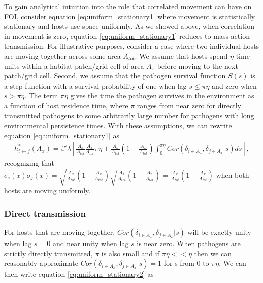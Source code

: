 \documentclass[letterpaper]{article}
\begin{document}
To gain analytical intuition into the role that correlated movement can have on FOI, consider equation \ref{eq:uniform_stationary1} where movement is statistically stationary and hosts use space uniformly.  As we showed above, when correlation in movement is zero, equation \ref{eq:uniform_stationary1} reduces to mass action transmission. 
For illustrative purposes, consider a case where two individual hosts are moving together across some area $A_{tot}$. We assume that hosts spend $\eta$ time units within a habitat patch/grid cell of area $A_x$ before moving to the next patch/grid cell. Second, we assume that the pathogen survival function $S(s)$ is a step function with a survival probability of one when lag $s \leq \pi \eta$ and zero when $s > \pi \eta$.  
The term $\pi \eta$ gives the time the pathogen survives in the environment as a function of host residence time, where $\pi$ ranges from near zero for directly transmitted pathogens to some arbitrarily large number for pathogens with long environmental persistence times.  With these assumptions, we can rewrite equation \ref {eq:uniform_stationary1} as 
\begin{equation}
    \begin{aligned}
        h^*_{i \leftarrow j}(A_x) = \beta' \lambda \left[\frac{A_x}{A_{tot}}\frac{A_x}{A_{tot}} \pi \eta + \frac{A_x}{A_{tot}}(1 - \frac{A_x}{A_{tot}}) \int_{0}^{\pi \eta} Cor(\delta_{i \in A_x}, \delta_{j \in A_x} | s) ds\right],
    \end{aligned}
    \label{eq:uniform_stationary2}
\end{equation}
recognizing that $\sigma_i(x) \sigma_j(x) = \sqrt{\frac{A_x}{A_{tot}}(1 - \frac{A_x}{A_{tot}})}\sqrt{\frac{A_x}{A_{tot}}(1 - \frac{A_x}{A_{tot}})} = \frac{A_x}{A_{tot}}(1 - \frac{A_x}{A_{tot}})$ when both hosts are moving uniformly.

\subsubsection*{Direct transmission}

For hosts that are moving together, $Cor(\delta_{i \in A_x}, \delta_{j \in A_x} | s)$ will be exactly unity when lag $s = 0$ and near unity when lag $s$ is near zero. When pathogens are strictly directly transmitted, $\pi$ is also small and if $\pi \eta << \eta$ then we can reasonably approximate $Cor(\delta_{i \in A_x}, \delta_{j \in A_x} | s) = 1$ for s from 0 to $\pi \eta$.  We can then write equation \ref{eq:uniform_stationary2} as 
\end{document}
